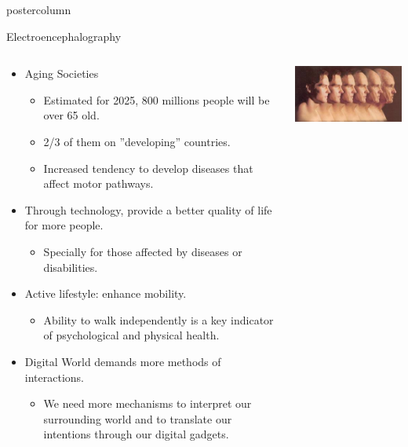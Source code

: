 \documentclass[final]{beamer}
\begin{document}
\begin{frame}
\begin{columns}
\begin{column}{.49\textwidth}
\begin{beamercolorbox}[center,wd=\textwidth]{postercolumn}
\begin{minipage}[T]{.95\textwidth}
{            \begin{block}{Electroencephalography}
              \begin{columns}
                \begin{column}{.6\textwidth}
                  \begin{itemize}
                  \item Aging Societies
                    \begin{itemize}
		    \item Estimated for 2025, 800 millions people will be over 65 old.
                    \item 2/3 of them on ''developing'' countries.
                    \item Increased tendency to develop diseases that affect motor pathways.
                    \end{itemize}
                  \item Through technology, provide a better quality of life for more people.
                    \begin{itemize}
                    \item Specially for those affected by diseases or disabilities.
                    \end{itemize}
                  \item Active lifestyle: enhance mobility.
                    \begin{itemize}
                    \item Ability to walk independently is a key indicator of psychological and physical health. 
                    \end{itemize}
                  \item Digital World demands more methods of interactions.
                    \begin{itemize}
                    \item We need more mechanisms to interpret our surrounding world and to translate our intentions through our digital gadgets.
                    \end{itemize}
                  \end{itemize}
                \end{column}
                \begin{column}{.39\textwidth}
		    \centering
		    \includegraphics[width=0.95\linewidth]{images/viola/aging}

\end{column}
\end{columns}
\end{block}}
\end{minipage}
\end{beamercolorbox}
\end{column}
\end{columns}
\end{frame}
\end{document}
